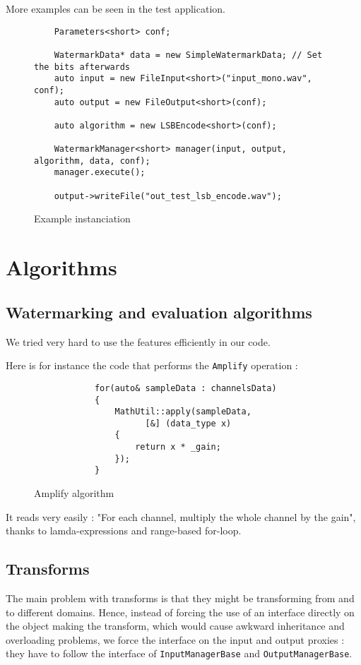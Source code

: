 More examples can be seen in the test application.

\begin{figure}[h!]
\centering

\begin{lstlisting}
    Parameters<short> conf;
    
    WatermarkData* data = new SimpleWatermarkData; // Set the bits afterwards 
    auto input = new FileInput<short>("input_mono.wav", conf);
    auto output = new FileOutput<short>(conf);

    auto algorithm = new LSBEncode<short>(conf);

    WatermarkManager<short> manager(input, output, algorithm, data, conf);
    manager.execute();

    output->writeFile("out_test_lsb_encode.wav");
\end{lstlisting}

\caption{Example instanciation}
\end{figure}

\newpage

\section{Algorithms}
\subsection{Watermarking and evaluation algorithms}
We tried very hard to use the  features efficiently in our code.

Here is for instance the code that performs the \texttt{Amplify} operation : 

\begin{figure}[ht!]
\centering
\begin{lstlisting}
			for(auto& sampleData : channelsData)
			{
				MathUtil::apply(sampleData,
					  [&] (data_type x)
				{
					return x * _gain;
				});
			}
\end{lstlisting}
\caption{Amplify algorithm}
\end{figure}

It reads very easily : "For each channel, multiply the whole channel by the gain", thanks to lamda-expressions and range-based for-loop.

\subsection{Transforms}
The main problem with transforms is that they might be transforming from and to different domains.
Hence, instead of forcing the use of an interface directly on the object making the transform, which would cause awkward inheritance and overloading problems, we force the interface on the input and output proxies : they have to follow the interface of \texttt{InputManagerBase} and \texttt{OutputManagerBase}.

